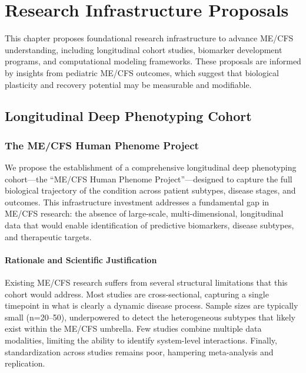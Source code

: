 \chapter{Research Infrastructure Proposals}
\label{ch:research-infrastructure}

\begin{chapterabstract}
This chapter proposes foundational research infrastructure to advance ME/CFS
understanding, including longitudinal cohort studies, biomarker development
programs, and computational modeling frameworks. These proposals are informed
by insights from pediatric ME/CFS outcomes, which suggest that biological
plasticity and recovery potential may be measurable and modifiable.
\end{chapterabstract}

\section{Longitudinal Deep Phenotyping Cohort}
\label{sec:deep-phenotyping-cohort}

\subsection{The ME/CFS Human Phenome Project}

We propose the establishment of a comprehensive longitudinal deep phenotyping cohort---the ``ME/CFS Human Phenome Project''---designed to capture the full biological trajectory of the condition across patient subtypes, disease stages, and outcomes. This infrastructure investment addresses a fundamental gap in ME/CFS research: the absence of large-scale, multi-dimensional, longitudinal data that would enable identification of predictive biomarkers, disease subtypes, and therapeutic targets.

\subsubsection{Rationale and Scientific Justification}

Existing ME/CFS research suffers from several structural limitations that this cohort would address. Most studies are cross-sectional, capturing a single timepoint in what is clearly a dynamic disease process. Sample sizes are typically small (n=20--50), underpowered to detect the heterogeneous subtypes that likely exist within the ME/CFS umbrella. Few studies combine multiple data modalities, limiting the ability to identify system-level interactions. Finally, standardization across studies remains poor, hampering meta-analysis and replication.


